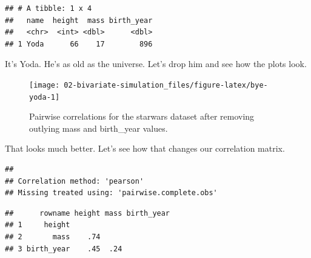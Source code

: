 \documentclass[]{book}
\newenvironment{Shaded}{\begin{snugshade}}{\end{snugshade}}
\newcommand{\KeywordTok}[1]{\textcolor[rgb]{0.13,0.29,0.53}{\textbf{#1}}}
\newcommand{\NormalTok}[1]{#1}
\newcommand{\OperatorTok}[1]{\textcolor[rgb]{0.81,0.36,0.00}{\textbf{#1}}}
\newcommand{\StringTok}[1]{\textcolor[rgb]{0.31,0.60,0.02}{#1}}
\begin{document}
\begin{verbatim}
## # A tibble: 1 x 4
##   name  height  mass birth_year
##   <chr>  <int> <dbl>      <dbl>
## 1 Yoda      66    17        896
\end{verbatim}

It's Yoda. He's as old as the universe. Let's drop him and see how the plots look.

\begin{Shaded}
\end{Shaded}

\begin{figure}

{\centering \texttt{[image: 02-bivariate-simulation\_files/figure-latex/bye-yoda-1]} 

}

\caption{Pairwise correlations for the starwars dataset after removing outlying mass and birth\_year values.}\label{fig:bye-yoda}
\end{figure}

That looks much better. Let's see how that changes our correlation matrix.

\begin{Shaded}
\end{Shaded}

\begin{verbatim}
## 
## Correlation method: 'pearson'
## Missing treated using: 'pairwise.complete.obs'
\end{verbatim}

\begin{verbatim}
##      rowname height mass birth_year
## 1     height                       
## 2       mass    .74                
## 3 birth_year    .45  .24
\end{verbatim}
\end{document}
